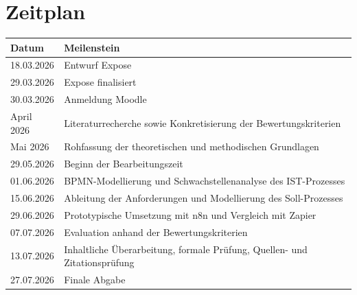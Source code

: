 ﻿\documentclass[a4paper,11pt]{article}
\begin{document}
\section{Zeitplan}
\begin{center}
    \begin{tabular}{@{}ll@{}}
        \toprule
        \textbf{Datum} & \textbf{Meilenstein} \\
        \midrule
        18.03.2026 & Entwurf Expose \\
        29.03.2026 & Expose finalisiert \\
        30.03.2026 & Anmeldung Moodle \\
        April 2026 & Literaturrecherche sowie Konkretisierung der Bewertungskriterien \\
        Mai 2026 & Rohfassung der theoretischen und methodischen Grundlagen \\
        29.05.2026 & Beginn der Bearbeitungszeit \\
        01.06.2026 & BPMN-Modellierung und Schwachstellenanalyse des IST-Prozesses \\
        15.06.2026 & Ableitung der Anforderungen und Modellierung des Soll-Prozesses \\
        29.06.2026 & Prototypische Umsetzung mit n8n und Vergleich mit Zapier \\
        07.07.2026 & Evaluation anhand der Bewertungskriterien \\
        13.07.2026 & Inhaltliche Überarbeitung, formale Prüfung, Quellen- und Zitationsprüfung \\
        27.07.2026 & Finale Abgabe \\
        \bottomrule
    \end{tabular}
\end{center}
\end{document}
